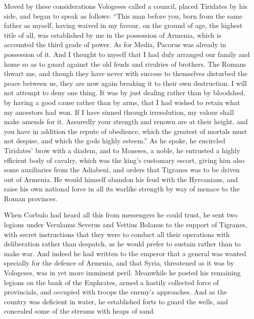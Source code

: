 Moved by these considerations Vologeses called a council, placed Tiridates by his side, and began to speak as follows: ``This man before you, born from the same father as myself, having waived in my favour, on the ground of age, the highest title of all, was established by me in the possession of Armenia, which is accounted the third grade of power. As for Media, Pacorus was already in possession of it. And I thought to myself that I had duly arranged our family and home so as to guard against the old feuds and rivalries of brothers. The Romans thwart me, and though they have never with success to themselves disturbed the peace between us, they are now again breaking it to their own destruction. I will not attempt to deny one thing. It was by just dealing rather than by bloodshed, by having a good cause rather than by arms, that I had wished to retain what my ancestors had won. If I have sinned through irresolution, my valour shall make amends for it. Assuredly your strength and renown are at their height, and you have in addition the repute of obedience, which the greatest of mortals must not despise, and which the gods highly esteem.'' As he spoke, he encircled Tiridates' brow with a diadem, and to Moneses, a noble, he entrusted a highly efficient body of cavalry, which was the king's customary escort, giving him also some auxiliaries from the Adiabeni, and orders that Tigranes was to be driven out of Armenia. He would himself abandon his feud with the Hyrcanians, and raise his own national force in all its warlike strength by way of menace to the Roman provinces.


When Corbulo had heard all this from messengers he could trust, he sent two legions under Verulanus Severus and Vettius Bolanus to the support of Tigranes, with secret instructions that they were to conduct all their operations with deliberation rather than despatch, as he would prefer to sustain rather than to make war. And indeed he had written to the emperor that a general was wanted specially for the defence of Armenia, and that Syria, threatened as it was by Vologeses, was in yet more imminent peril. Meanwhile he posted his remaining legions on the bank of the Euphrates, armed a hastily collected force of provincials, and occupied with troops the enemy's approaches. And as the country was deficient in water, he established forts to guard the wells, and concealed some of the streams with heaps of sand.


